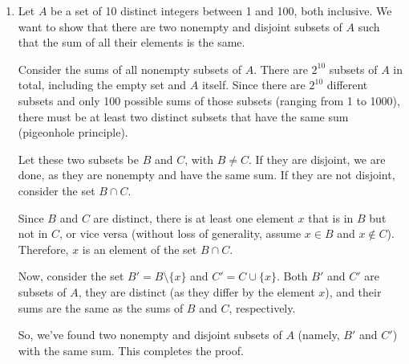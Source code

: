 \documentclass{article}
\theoremstyle{definition}
\begin{document}
\begin{solution}
\begin{enumerate}
    \item Let $A$ be a set of 10 distinct integers between 1 and 100, both inclusive. We want to show that there are two nonempty and disjoint subsets of $A$ such that the sum of all their elements is the same.

    Consider the sums of all nonempty subsets of $A$. There are $2^{10}$ subsets of $A$ in total, including the empty set and $A$ itself. Since there are $2^{10}$ different subsets and only 100 possible sums of those subsets (ranging from 1 to 1000), there must be at least two distinct subsets that have the same sum (pigeonhole principle).

    Let these two subsets be $B$ and $C$, with $B \neq C$. If they are disjoint, we are done, as they are nonempty and have the same sum. If they are not disjoint, consider the set $B \cap C$.

    Since $B$ and $C$ are distinct, there is at least one element $x$ that is in $B$ but not in $C$, or vice versa (without loss of generality, assume $x \in B$ and $x \notin C$). Therefore, $x$ is an element of the set $B \cap C$.

    Now, consider the set $B' = B \setminus \{x\}$ and $C' = C \cup \{x\}$. Both $B'$ and $C'$ are subsets of $A$, they are distinct (as they differ by the element $x$), and their sums are the same as the sums of $B$ and $C$, respectively.

    So, we've found two nonempty and disjoint subsets of $A$ (namely, $B'$ and $C'$) with the same sum. This completes the proof.
\end{enumerate}
\end{solution}
\end{document}

